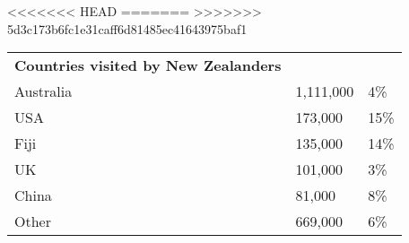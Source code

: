 <<<<<<< HEAD
=======
>>>>>>> 5d3c173b6fc1e31caff6d81485ec41643975baf1
\begin{tabular}[t]{p{4.7cm}>{\hfill}p{1.1cm}>{\hfill}p{1.7cm}}
 \textbf{Countries visited by New Zealanders} &   &   \\ 
 Australia & 1,111,000 & 4\% \\ 
  USA &   173,000 & 15\% \\ 
  Fiji &   135,000 & 14\% \\ 
  UK &   101,000 & 3\% \\ 
  China &    81,000 & 8\% \\ 
  Other &   669,000 & 6\% \\ 
  \end{tabular}
